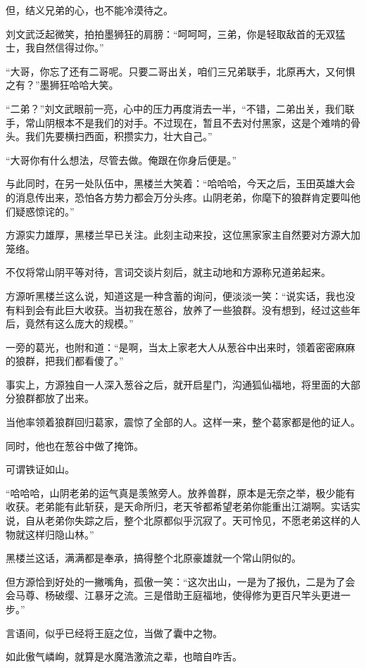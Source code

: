 \begin{this_body}
但，结义兄弟的心，也不能冷漠待之。

刘文武泛起微笑，拍拍墨狮狂的肩膀：“呵呵呵，三弟，你是轻取敌首的无双猛士，我自然信得过你。”

“大哥，你忘了还有二哥呢。只要二哥出关，咱们三兄弟联手，北原再大，又何惧之有？”墨狮狂哈哈大笑。

“二弟？”刘文武眼前一亮，心中的压力再度消去一半，“不错，二弟出关，我们联手，常山阴根本不是我们的对手。不过现在，暂且不去对付黑家，这是个难啃的骨头。我们先要横扫西面，积攒实力，壮大自己。”

“大哥你有什么想法，尽管去做。俺跟在你身后便是。”

与此同时，在另一处队伍中，黑楼兰大笑着：“哈哈哈，今天之后，玉田英雄大会的消息传出来，恐怕各方势力都会万分头疼。山阴老弟，你麾下的狼群肯定要叫他们疑惑惊诧的。”

方源实力雄厚，黑楼兰早已关注。此刻主动来投，这位黑家家主自然要对方源大加笼络。

不仅将常山阴平等对待，言词交谈片刻后，就主动地和方源称兄道弟起来。

方源听黑楼兰这么说，知道这是一种含蓄的询问，便淡淡一笑：“说实话，我也没有料到会有此巨大收获。当初我在葱谷，放养了一些狼群。没有想到，经过这些年后，竟然有这么庞大的规模。”

一旁的葛光，也附和道：“是啊，当太上家老大人从葱谷中出来时，领着密密麻麻的狼群，把我们都看傻了。”

事实上，方源独自一人深入葱谷之后，就开启星门，沟通狐仙福地，将里面的大部分狼群都放了出来。

当他率领着狼群回归葛家，震惊了全部的人。这样一来，整个葛家都是他的证人。

同时，他也在葱谷中做了掩饰。

可谓铁证如山。

“哈哈哈，山阴老弟的运气真是羡煞旁人。放养兽群，原本是无奈之举，极少能有收获。老弟能有此斩获，是天命所归，老天爷都希望老弟你能重出江湖啊。实话实说，自从老弟你失踪之后，整个北原都似乎沉寂了。天可怜见，不愿老弟这样的人物就这样归隐山林。”

黑楼兰这话，满满都是奉承，搞得整个北原豪雄就一个常山阴似的。

但方源恰到好处的一撇嘴角，孤傲一笑：“这次出山，一是为了报仇，二是为了会会马尊、杨破缨、江暴牙之流。三是借助王庭福地，使得修为更百尺竿头更进一步。”

言语间，似乎已经将王庭之位，当做了囊中之物。

如此傲气嶙峋，就算是水魔浩激流之辈，也暗自咋舌。


\end{this_body}
